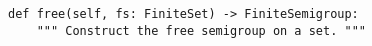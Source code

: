 \begin{verbatim}
def free(self, fs: FiniteSet) -> FiniteSemigroup:
    """ Construct the free semigroup on a set. """
\end{verbatim}